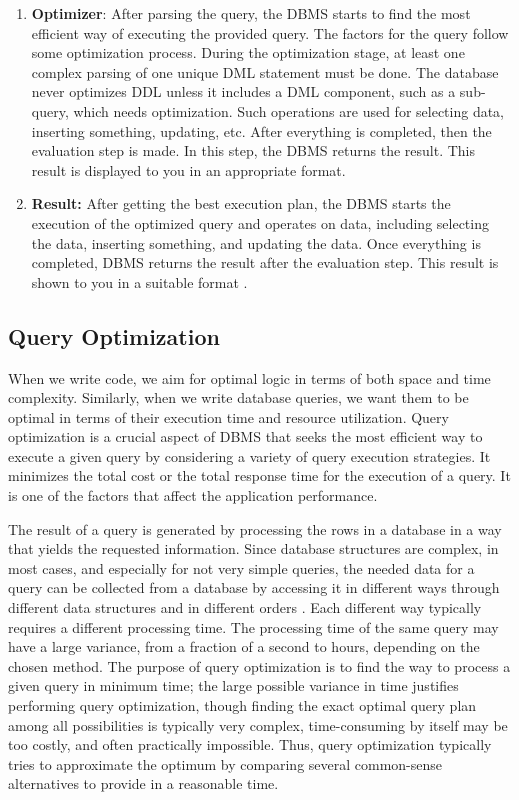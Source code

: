 \begin{enumerate}
    \item \textbf{Optimizer}: After parsing the query, the DBMS starts to find the most efficient way of executing the provided query. The factors for the query follow some optimization process. During the optimization stage, at least one complex parsing of one unique DML statement must be done. The database never optimizes DDL unless it includes a DML component, such as a sub-query, which needs optimization. Such operations are used for selecting data, inserting something, updating, etc. After everything is completed, then the evaluation step is made. In this step, the DBMS returns the result. This result is displayed to you in an appropriate format.
    
    \item \textbf{Result:} After getting the best execution plan, the DBMS starts the execution of the optimized query and operates on data, including selecting the data, inserting something, and updating the data. Once everything is completed, DBMS returns the result after the evaluation step. This result is shown to you in a suitable format \cite{Query,QueryProcessing,Oracle}.
    
\end{enumerate}

\subsection{Query Optimization } When we write code, we aim for optimal logic in terms of both space and time complexity. Similarly, when we write database queries, we want them to be optimal in terms of their execution time and resource utilization. Query optimization is a crucial aspect of DBMS that seeks the most efficient way to execute a given query by considering a variety of query execution strategies. It minimizes the total cost or the total response time for the execution of a query. It is one of the factors that affect the application performance.\vspace{.4cm}

The result of a query is generated by processing the rows in a database in a way that yields the requested information. Since database structures are complex, in most cases, and especially for not very simple queries, the needed data for a query can be collected from a database by accessing it in different ways through different data structures and in different orders \cite{selinger-1979}. Each different way typically requires a different processing time. The processing time of the same query may have a large variance, from a fraction of a second to hours, depending on the chosen method. The purpose of query optimization is to find the way to process a given query in minimum time; the large possible variance in time justifies performing query optimization, though finding the exact optimal query plan among all possibilities is typically very complex, time-consuming by itself may be too costly, and often practically impossible. Thus, query optimization typically tries to approximate the optimum by comparing several common-sense alternatives to provide in a reasonable time.\vspace{.4cm}

